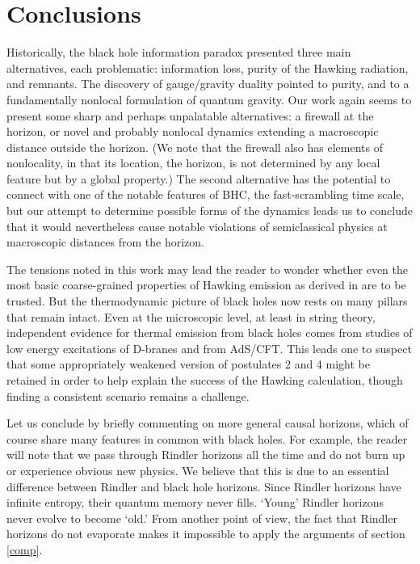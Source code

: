 \documentclass[12pt]{article}
\newcommand{\sect}[1]{\section{#1}\setcounter{equation}{0}}
\begin{document}
\sect{Conclusions}

Historically, the black hole information paradox presented three main alternatives, each problematic: information loss, purity of the Hawking radiation, and remnants.  The discovery of gauge/gravity duality pointed to purity, and to a fundamentally nonlocal formulation of quantum gravity.  Our work again seems to present some sharp and perhaps unpalatable alternatives: a firewall at the horizon, or novel and probably nonlocal dynamics extending a macroscopic distance outside the horizon.  (We note that the firewall also has elements of nonlocality, in that its location, the horizon, is not determined by any local feature but by a global property.)  The second alternative has the potential to connect with one of the notable features of BHC, the fast-scrambling time scale, but our attempt to determine possible forms of the dynamics leads us to conclude that it would {nevertheless cause notable violations of semiclassical physics at macroscopic distances from the horizon.}

The tensions noted in this work may lead the reader to wonder whether even the most basic coarse-grained properties of Hawking emission as derived in \cite{Hawking:1974sw} are to be trusted.  But the thermodynamic picture of black holes now rests on many pillars that remain intact.  Even at the microscopic level, at least in string theory, independent evidence for thermal emission from black holes  comes from studies of low energy excitations of D-branes and from AdS/CFT.  This leads one to suspect that some appropriately weakened version of postulates 2 and 4 might be retained in order to help explain the success of the Hawking calculation, though finding a consistent scenario remains a challenge.

Let us conclude by briefly commenting on more general causal horizons, which of course share many features in common with black holes.  For example, the reader will note that we pass through Rindler horizons all the time and do not burn up or experience obvious new physics.   We believe that this is due to an essential difference between Rindler and black hole horizons.
Since Rindler horizons have infinite entropy, their quantum memory never fills.  `Young' Rindler horizons never evolve to become `old.' From another point of view, the fact that Rindler horizons do not evaporate makes it impossible to apply the arguments of section \ref{comp}.
\end{document}

